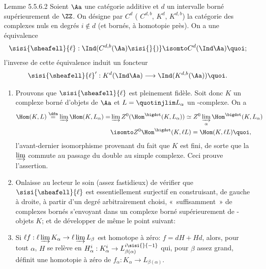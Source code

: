 \begin{enonce*}{Lemme 5.5.6.2}
Soient $\Aa$ une catégorie additive et $d$ un intervalle borné
supérieurement de $\ZZ$. On désigne par $C^{d}$ (\resp
$C^{d,b}$, \resp $K^{d}$, \resp $K^{d,b}$) la catégorie des complexes
nuls en degrés $i\not\in d$ (\resp et bornés, \resp à homotopie
près). On a une équivalence
$$
\sisi{\sheafell }{\ell}:\Ind(C^{d,b}(\Aa)\sisi{}{)}\isomto
C^{d}(\Ind\Aa){\quoi};
$$
l'inverse de cette équivalence induit un foncteur
$$
\sisi{\sheafell }{\ell}':K^{d}(\Ind\Aa)\longrightarrow
\Ind(K^{d,b}(\Aa)){\quoi}.
$$
\end{enonce*}

\begin{enumerate}
\renewcommand{\theenumi}{\Alph{enumi}}
\renewcommand{\labelenumi}{\theenumi)}
\item Prouvons que $\sisi{\sheafell }{\ell}$ est pleinement fidèle. Soit donc $K$ un
complexe borné d'objets de $\Aa$ et $L=\quotinjlim
L_{\alpha}$ un \iInd-complexe. On a
\begin{align*}
\Hom(K,L)\overset{\dfn}{=} \varinjlim \Hom(K,L_{\alpha})  = & \varinjlim
Z^{0}(\Hom^{\bigdot} (K,L_{\alpha}))\simeq Z^{0}
\varinjlim_{\alpha} \Hom^{\bigdot} (K,L_{\alpha})\\
& \isomto
Z^{0} \Hom^{\bigdot} (K,\ell L)=\Hom(K,\ell L){\quoi},
\end{align*}
l'avant-dernier isomorphisme provenant du fait que $K$ est fini, de
sorte que la $\varinjlim$ commute au passage du double au simple
complexe. Ceci prouve l'assertion.

\item On\pageoriginale laisse au lecteur le soin (assez fastidieux) de
vérifier que $\sisi{\sheafell }{\ell}$ est essentiellement surjectif en construisant,
de gauche à droite, à partir d'un degré arbitrairement choisi, « suffisamment »  de complexes bornés s'envoyant dans un complexe
borné supérieurement de \iInd-objets $K$; et de développer de même le
point suivant:

\item Si $\ell f:\ell \varinjlim K_{\alpha}\rightarrow \ell \varinjlim
L_{\beta}$ est homotope à zéro: $f=dH+Hd$, alors, pour tout $\alpha$,
$H$ se relève en $H^{i}_{\alpha}:K^{i}_{\alpha}\rightarrow
L^{i\sisi{}{-1}}_{\beta(\alpha)}$ qui, pour $\beta$ assez grand, définit une
homotopie à zéro de $f_{\alpha}:K_{\alpha}\rightarrow L_{\beta(\alpha)}$.
\end{enumerate}

\setcounter{subsubsection}{6}
\setcounter{paragraph}{2}
